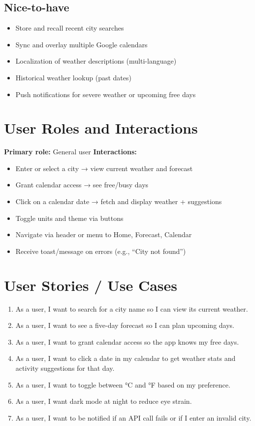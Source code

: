 \documentclass[11pt,a4paper]{article}
\begin{document}
\subsection*{Nice-to-have}
\begin{itemize}[nosep]
  \item Store and recall recent city searches
  \item Sync and overlay multiple Google calendars
  \item Localization of weather descriptions (multi-language)
  \item Historical weather lookup (past dates)
  \item Push notifications for severe weather or upcoming free days
\end{itemize}

\section{User Roles and Interactions}
\textbf{Primary role:} General user  
\textbf{Interactions:}
\begin{itemize}[nosep]
  \item Enter or select a city → view current weather and forecast
  \item Grant calendar access → see free/busy days
  \item Click on a calendar date → fetch and display weather + suggestions
  \item Toggle units and theme via buttons
  \item Navigate via header or menu to Home, Forecast, Calendar
  \item Receive toast/message on errors (e.g., “City not found”)
\end{itemize}

\section{User Stories / Use Cases}
\begin{enumerate}[nosep]
  \item As a user, I want to search for a city name so I can view its current weather.
  \item As a user, I want to see a five-day forecast so I can plan upcoming days.
  \item As a user, I want to grant calendar access so the app knows my free days.
  \item As a user, I want to click a date in my calendar to get weather stats and activity suggestions for that day.
  \item As a user, I want to toggle between °C and °F based on my preference.
  \item As a user, I want dark mode at night to reduce eye strain.
  \item As a user, I want to be notified if an API call fails or if I enter an invalid city.
\end{enumerate}
\end{document}

